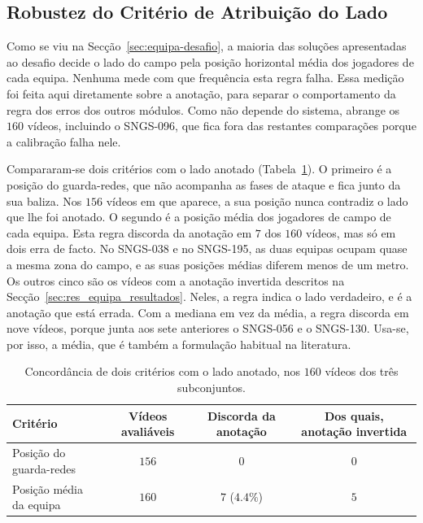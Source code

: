 \subsection{Robustez do Critério de Atribuição do Lado}\label{sec:res_lado_quantificacao}

Como se viu na Secção~\ref{sec:equipa-desafio}, a maioria das soluções apresentadas ao desafio decide o lado do campo pela posição horizontal média dos jogadores de cada equipa. Nenhuma mede com que frequência esta regra falha. Essa medição foi feita aqui diretamente sobre a anotação, para separar o comportamento da regra dos erros dos outros módulos. Como não depende do sistema, abrange os $160$ vídeos, incluindo o SNGS-096, que fica fora das restantes comparações porque a calibração falha nele.


Compararam-se dois critérios com o lado anotado (Tabela~\ref{tab:lado-inversoes}). O primeiro é a posição do guarda-redes, que não acompanha as fases de ataque e fica junto da sua baliza. Nos $156$ vídeos em que aparece, a sua posição nunca contradiz o lado que lhe foi anotado. O segundo é a posição média dos jogadores de campo de cada equipa. Esta regra discorda da anotação em $7$ dos $160$ vídeos, mas só em dois erra de facto. No SNGS-038 e no SNGS-195, as duas equipas ocupam quase a mesma zona do campo, e as suas posições médias diferem menos de um metro. Os outros cinco são os vídeos com a anotação invertida descritos na Secção~\ref{sec:res_equipa_resultados}. Neles, a regra indica o lado verdadeiro, e é a anotação que está errada. Com a mediana em vez da média, a regra discorda em nove vídeos, porque junta aos sete anteriores o SNGS-056 e o SNGS-130. Usa-se, por isso, a média, que é também a formulação habitual na literatura.

\begin{table}[H]
    \centering
    \caption{Concordância de dois critérios com o lado anotado, nos $160$ vídeos dos três subconjuntos.}
    \label{tab:lado-inversoes}
    \begin{tabular}{|l|c|c|c|}
        \hline
        \textbf{Critério} & \textbf{Vídeos avaliáveis} & \textbf{Discorda da anotação} & \textbf{Dos quais, anotação invertida} \\
        \hline
        Posição do guarda-redes  & $156$ & $0$ & $0$ \\
        \hline
        Posição média da equipa  & $160$ & $7$ ($4.4\%$) & $5$ \\
        \hline
    \end{tabular}
\end{table}

